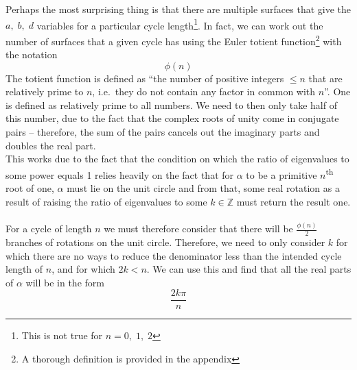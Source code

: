 \documentclass[12pt]{article}
\begin{document}
Perhaps the most surprising thing is that there are multiple surfaces that give the $a,\;b,\;d$ variables for a particular cycle length\footnote{This is not true for $n=0,\;1,\;2$}. In fact, we can work out the number of surfaces that a given cycle has using the Euler totient function\footnote{A thorough definition is provided in the appendix} with the notation
	\[\phi(n)\]
The totient function is defined as ``the number of positive integers $\le n$ that are relatively prime to $n$, i.e.\ they do not contain any factor in common with $n$''\cite{totient}. One is defined as relatively prime to all numbers. We need to then only take half of this number, due to the fact that the complex roots of unity come in conjugate pairs -- therefore, the sum of the pairs cancels out the imaginary parts and doubles the real part. 
\\
This works due to the fact that the condition on which the ratio of eigenvalues to some power equals 1 relies heavily on the fact that for $\alpha$ to be a primitive $n$\textsuperscript{th} root of one, $\alpha$ must lie on the unit circle and from that, some real rotation as a result of raising the ratio of eigenvalues to some $k\in\mathbb{Z} $ must return the result one.\\ \\
For a cycle of length $n$ we must therefore consider that there will be $\frac{\phi(n)}{2}$ branches of rotations on the unit circle. Therefore, we need to only consider $k$ for which there are no ways to reduce the denominator less than the intended cycle length of $n$, and for which $2k<n$. We can use this and find that all the real parts of $\alpha$ will be in the form
	\[\frac{2k\pi}{n}\]
\newpage
\end{document}
